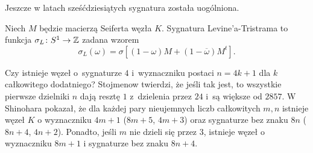 Jeszcze w latach sześćdziesiątych sygnatura została uogólniona.

\begin{definition}
    Niech $M$ będzie macierzą Seiferta węzła $K$.
    Sygnatura Levine'a-Tristrama to funkcja $\sigma_L \colon S^1 \to \mathbb Z$ zadana wzorem
    \begin{equation}
        \sigma_L(\omega) = \sigma[(1 - \omega)M + (1 - \overline \omega) M^t].
    \end{equation}
\end{definition}

Czy istnieje węzeł o~sygnaturze $4$ i~wyznaczniku postaci $n = 4k + 1$ dla $k$ całkowitego dodatniego?
Stojmenow twierdzi, że jeśli tak jest, to wszystkie pierwsze dzielniki $n$ dają resztę $1$ z~dzielenia przez $24$ i~są większe od $2857$.
W~\cite{shinohara71} Shinohara pokazał, że dla każdej pary nieujemnych liczb całkowitych $m, n$ istnieje węzeł $K$ o wyznaczniku $4m+1$ ($8m+5$, $4m+3$) oraz sygnaturze bez znaku $8n$ ($8n+4$, $4n+2$).
Ponadto, jeśli $m$ nie dzieli się przez $3$, istnieje węzeł o wyznaczniku $8m+1$ i sygnaturze bez znaku $8n+4$.

